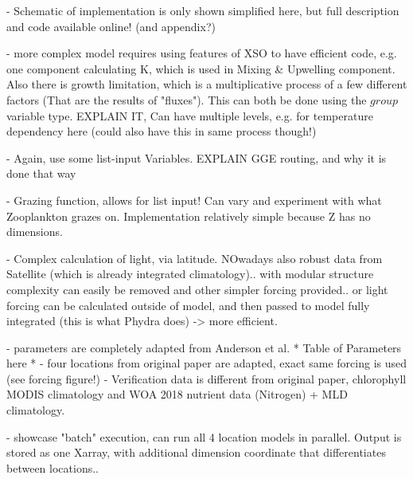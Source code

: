 \documentclass[journal abbreviation, manuscript]{copernicus}
\begin{document}
- Schematic of implementation is only shown simplified here, but full description and code available online! (and appendix?)

- more complex model requires using features of XSO to have efficient code, e.g. one component calculating K, which is used in Mixing & Upwelling component. Also there is growth limitation, which is a multiplicative process of a few different factors (That are the results of "fluxes"). This can both be done using the $group$ variable type. EXPLAIN IT, Can have multiple levels, e.g. for temperature dependency here (could also have this in same process though!)

- Again, use some list-input Variables. EXPLAIN GGE routing, and why it is done that way

- Grazing function, allows for list input! Can vary and experiment with what Zooplankton grazes on. Implementation relatively simple because Z has no dimensions.

- Complex calculation of light, via latitude. NOwadays also robust data from Satellite (which is already integrated climatology).. with modular structure complexity can easily be removed and other simpler forcing provided.. or light forcing can be calculated outside of model, and then passed to model fully integrated (this is what Phydra does) -> more efficient.

- parameters are completely adapted from Anderson et al.
* Table of Parameters here *
- four locations from original paper are adapted, exact same forcing is used (see forcing figure!)
- Verification data is different from original paper, chlorophyll MODIS climatology and WOA 2018 nutrient data (Nitrogen) + MLD climatology.

- showcase "batch" execution, can run all 4 location models in parallel. Output is stored as one Xarray, with additional dimension coordinate that differentiates between locations..
\end{document}
